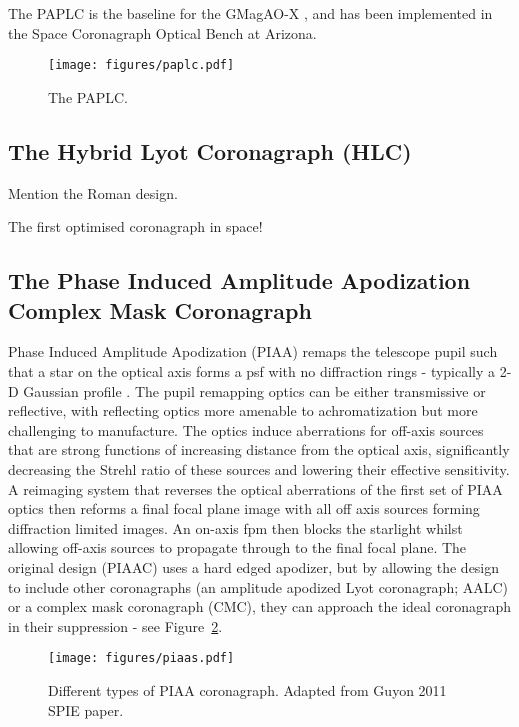 \documentclass[letterpaper]{ar-1col}
\begin{document}
The PAPLC is the baseline for the GMagAO-X \citep{Males24}, and has been implemented in the Space Coronagraph Optical Bench \citep[SCOoB; ][]{Ashcraft22,vanGorkom22} at Arizona.

\begin{figure}[ht]
  \centering
  \texttt{[image: figures/paplc.pdf]}
  \caption{The PAPLC.}
  \label{fig:coro_paplc}
\end{figure}

\subsection{The Hybrid Lyot Coronagraph (HLC)}

Mention the Roman design.

The first optimised coronagraph in space!


\subsection{The Phase Induced Amplitude Apodization Complex Mask Coronagraph}

Phase Induced Amplitude Apodization (PIAA) remaps the telescope pupil such that a star on the optical axis forms a \ac{psf} with no diffraction rings - typically a 2-D Gaussian profile \citep{Guyon03,Guyon05,Guyon14}.
%
The pupil remapping optics can be either transmissive or reflective, with reflecting optics more amenable to achromatization but more challenging to manufacture.
%
The optics induce aberrations for off-axis sources that are strong functions of increasing distance from the optical axis, significantly decreasing the Strehl ratio of these sources and lowering their effective sensitivity.
%
A reimaging system that reverses the optical aberrations of the first set of PIAA optics then reforms a final focal plane image with all off axis sources forming diffraction limited images.
%
An on-axis \ac{fpm} then blocks the starlight whilst allowing off-axis sources to propagate through to the final focal plane.
%
The original design (PIAAC) uses a hard edged apodizer, but by allowing the design to include other coronagraphs (an amplitude apodized Lyot coronagraph; AALC) or a complex mask coronagraph (CMC), they can approach the ideal coronagraph in their suppression - see Figure~\ref{fig:piaatypes}.

\begin{figure}[ht]
  \centering
  \texttt{[image: figures/piaas.pdf]}
  \caption{Different types of PIAA coronagraph. Adapted from Guyon 2011 SPIE paper.}
  \label{fig:piaatypes}
\end{figure}
\end{document}

